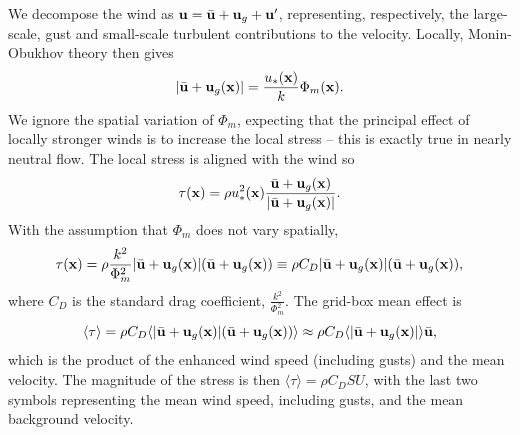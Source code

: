 \documentclass{UMDP_article}
\begin{document}
We decompose the wind as ${\bf u}=\bar{\bf u} + {\bf u}_g + {\bf u}'$,
representing, respectively, the large-scale, gust and small-scale
turbulent contributions to the velocity. Locally, Monin-Obukhov theory
then gives
\begin{equation}
  |\bar{\bf u} + {\bf u}_g({\bf x}) | = \frac{u_*({\bf x})}{k} \Phi_m({\bf x}).
\end{equation}
We ignore the spatial variation of $\Phi_m$, expecting that the
principal effect of locally stronger winds is to increase the local
stress -- this is exactly true in nearly neutral flow. The local
stress is aligned with the wind so
\begin{equation} {\bf \tau}({\bf x}) = \rho u_*^2({\bf x})
  \frac{\bar{\bf u} + {\bf u}_g({\bf x})} {|\bar{\bf u} + {\bf
      u}_g({\bf x})|}.
\end{equation}
With the assumption that $\Phi_m$ does not vary spatially,
\begin{equation} {\bf \tau}({\bf x}) = \rho \frac{k^2}{\Phi_m^2}
  |\bar{\bf u} + {\bf u}_g({\bf x})| (\bar{\bf u} + {\bf u}_g({\bf
    x})) \equiv \rho C_D |\bar{\bf u} + {\bf u}_g({\bf x})| (\bar{\bf
    u} + {\bf u}_g({\bf x})),
\end{equation}
where $C_D$ is the standard drag coefficient, $\frac{k^2}{\Phi_m^2}$.
The grid-box mean effect is
\begin{equation}
  \langle{\bf \tau}\rangle = \rho C_D \langle |\bar{\bf u} + {\bf u}_g({\bf x})|
  (\bar{\bf u} + {\bf u}_g({\bf x})) \rangle \approx \rho C_D \langle 
  |\bar{\bf u} + {\bf u}_g({\bf x})| \rangle \bar{\bf u},
\end{equation}
which is the product of the enhanced wind speed (including gusts) and
the mean velocity. The magnitude of the stress is then
$\langle\tau\rangle = \rho C_D S U$, with the last two symbols
representing the mean wind speed, including gusts, and the mean
background velocity.
\end{document}
